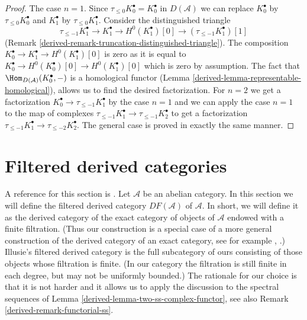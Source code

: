 \begin{proof}

The case $n = 1$. Since $\tau_{\leq 0}K_0^\bullet = K_0^\bullet$
in $D(\mathcal{A})$ we can replace
$K_0^\bullet$ by $\tau_{\leq 0}K_0^\bullet$ and
$K_1^\bullet$ by $\tau_{\leq 0}K_1^\bullet$.
Consider the distinguished triangle
$$
\tau_{\leq -1}K_1^\bullet \to K_1^\bullet \to
H^0(K_1^\bullet)[0] \to (\tau_{\leq -1}K_1^\bullet)[1]
$$
(Remark \ref{derived-remark-truncation-distinguished-triangle}).
The composition $K_0^\bullet \to K_1^\bullet \to H^0(K_1^\bullet)[0]$
is zero as it is equal to $K_0^\bullet \to H^0(K_0^\bullet)[0] \to
H^0(K_1^\bullet)[0]$ which is zero by assumption.
The fact that $\Hom_{D(\mathcal{A})}(K_0^\bullet, -)$
is a homological functor (Lemma \ref{derived-lemma-representable-homological}),
allows us to find the desired factorization.
For $n = 2$ we get a factorization
$K_0^\bullet \to \tau_{\leq -1}K_1^\bullet$ by the case $n = 1$
and we can apply the case $n = 1$ to the map of complexes
$\tau_{\leq -1}K_1^\bullet \to \tau_{\leq -1}K_2^\bullet$
to get a factorization
$\tau_{\leq -1}K_1^\bullet \to \tau_{\leq -2}K_2^\bullet$.
The general case is proved in exactly the same manner.
\end{proof}

\section{Filtered derived categories}
\label{derived-section-filtered-derived-category}
A reference for this section is \cite[I, Chapter V]{cotangent}. Let
$\mathcal{A}$ be an abelian category. In this section we will define the
filtered derived category $DF(\mathcal{A})$ of $\mathcal{A}$.
In short, we will define it as the derived category
of the exact category of objects of $\mathcal{A}$ endowed with a finite
filtration. (Thus our construction is a special case of a
more general construction of the derived category of an
exact category, see for example \cite{Buhler}, \cite{Keller}.)
Illusie's filtered derived category is the full subcategory
of ours consisting of those objects whose filtration is finite.
(In our category the filtration is still finite in each degree, but may
not be uniformly bounded.) The rationale for our choice is that it is not
harder and it allows us to apply the discussion to the spectral sequences of
Lemma \ref{derived-lemma-two-ss-complex-functor}, see also
Remark \ref{derived-remark-functorial-ss}.

